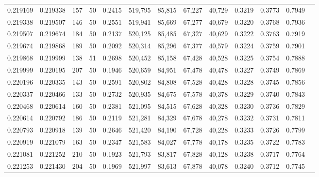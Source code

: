\begin{tabular}{rrrrrrrrrrrrr}
0.219169 & 0.219338 &   157 &  50 &                                     0.2415 & 519,795 &  85,815 &  67,227 &  40,729 & 0.3219 & 0.3773 & 0.7949 \\
0.219338 & 0.219507 &   146 &  50 &                                     0.2551 & 519,941 &  85,669 &  67,277 &  40,679 & 0.3220 & 0.3768 & 0.7936 \\
0.219507 & 0.219674 &   184 &  50 &                                     0.2137 & 520,125 &  85,485 &  67,327 &  40,629 & 0.3222 & 0.3763 & 0.7919 \\
0.219674 & 0.219868 &   189 &  50 &                                     0.2092 & 520,314 &  85,296 &  67,377 &  40,579 & 0.3224 & 0.3759 & 0.7901 \\
0.219868 & 0.219999 &   138 &  51 &                                     0.2698 & 520,452 &  85,158 &  67,428 &  40,528 & 0.3225 & 0.3754 & 0.7888 \\
0.219999 & 0.220195 &   207 &  50 &                                     0.1946 & 520,659 &  84,951 &  67,478 &  40,478 & 0.3227 & 0.3749 & 0.7869 \\
0.220196 & 0.220335 &   143 &  50 &                                     0.2591 & 520,802 &  84,808 &  67,528 &  40,428 & 0.3228 & 0.3745 & 0.7856 \\
0.220337 & 0.220466 &   133 &  50 &                                     0.2732 & 520,935 &  84,675 &  67,578 &  40,378 & 0.3229 & 0.3740 & 0.7843 \\
0.220468 & 0.220614 &   160 &  50 &                                     0.2381 & 521,095 &  84,515 &  67,628 &  40,328 & 0.3230 & 0.3736 & 0.7829 \\
0.220614 & 0.220792 &   186 &  50 &                                     0.2119 & 521,281 &  84,329 &  67,678 &  40,278 & 0.3232 & 0.3731 & 0.7811 \\
0.220793 & 0.220918 &   139 &  50 &                                     0.2646 & 521,420 &  84,190 &  67,728 &  40,228 & 0.3233 & 0.3726 & 0.7799 \\
0.220919 & 0.221079 &   163 &  50 &                                     0.2347 & 521,583 &  84,027 &  67,778 &  40,178 & 0.3235 & 0.3722 & 0.7783 \\
0.221081 & 0.221252 &   210 &  50 &                                     0.1923 & 521,793 &  83,817 &  67,828 &  40,128 & 0.3238 & 0.3717 & 0.7764 \\
0.221253 & 0.221430 &   204 &  50 &                                     0.1969 & 521,997 &  83,613 &  67,878 &  40,078 & 0.3240 & 0.3712 & 0.7745 \\

\end{tabular}
